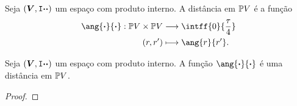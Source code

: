 \begin{defi}
Seja $(\bm V,\mathtt I{\bm{\cdot}}{\bm{\cdot}})$ um espaço com produto interno. A distância em $\mathbb{P} V$ é a função
	\begin{align*}
	\func{\ang{\var}{\var}}{\pro V \times \pro V}{\intff{0}{\frac{\tau}{4}}}{(r,r')}{\ang{r}{r'}}.
	\end{align*}
\end{defi}

\begin{prop}
Seja $(\bm V,\mathtt I{\bm{\cdot}}{\bm{\cdot}})$ um espaço com produto interno. A função $\ang{\var}{\var}$ é uma distância em $\mathbb{P} V$.
\end{prop}
\begin{proof}

\end{proof}
